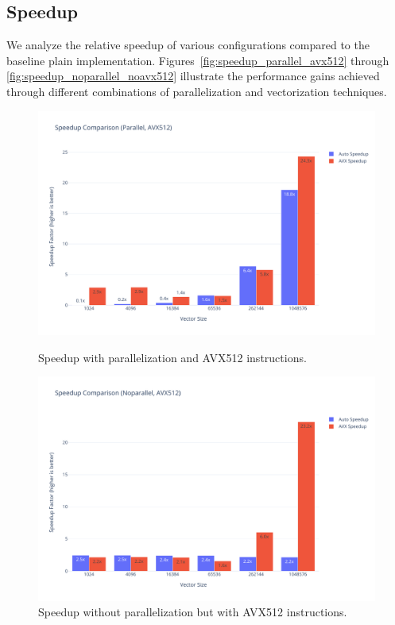 \documentclass[10pt]{article}
\begin{document}
\subsection*{Speedup}
We analyze the relative speedup of various configurations compared to the baseline plain implementation. Figures~\ref{fig:speedup_parallel_avx512} through \ref{fig:speedup_noparallel_noavx512} illustrate the performance gains achieved through different combinations of parallelization and vectorization techniques.

\begin{figure}[H]
  \centering
  \begin{minipage}{0.48\textwidth}
    \centering
    \includegraphics[width=\textwidth]{../images/speedup/softmax_speedup_parallel_avx512.pdf}
    \caption{Speedup with parallelization and AVX512 instructions.}
    \label{fig:speedup_parallel_avx512}
  \end{minipage}
  \hfill
  \begin{minipage}{0.48\textwidth}
    \centering
    \includegraphics[width=\textwidth]{../images/speedup/softmax_speedup_noparallel_avx512.pdf}
    \caption{Speedup without parallelization but with AVX512 instructions.}
    \label{fig:speedup_noparallel_avx512}
  \end{minipage}
\end{figure}
\end{document}
